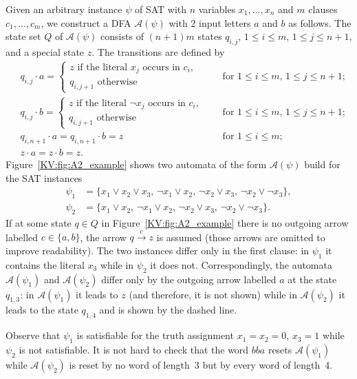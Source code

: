 \documentclass{irmaart}
\begin{document}
Given an arbitrary instance $\psi$ of \textsc{SAT} with $n$
variables $x_1,\dots,x_n$ and $m$ clauses $c_1,\dots,c_m$, we
construct a DFA $\mathcal{A}(\psi)$ with 2 input letters $a$ and
$b$ as follows. The state set $Q$ of $\mathcal{A}(\psi)$ consists
of $(n+1)m$ states $q_{i,j}$, $1 \le i \le m$, $1 \le j \le n+1$,
and a special state $z$. The transitions are defined by
\begin{align*}
& q_{i,j}\cdot a =
\begin{cases}
    z \text{ if the literal $x_j$ occurs in $c_i$},\\
    q_{i,j+1} \text{ otherwise}
\end{cases} && \text{ for $1 \le i \le m$, $1 \le j \le n+1$;} \\
&q_{i,j}\cdot b =
\begin{cases}
    z \text{ if the literal $\neg x_j$ occurs in $c_i$},\\
    q_{i,j+1} \text{ otherwise}
\end{cases} && \text{ for $1 \le i \le m$, $1 \le j \le n+1$;} \\
&q_{i,n+1}\cdot a=q_{i,n+1}\cdot b =z && \text{ for $1\le i\le
m$;}\\  &z\cdot a=z\cdot b =z.&&
\end{align*}
Figure~\ref{KV:fig:A2_example} shows two automata of the form
$\mathcal{A}(\psi)$ build for the \textsc{SAT} instances
\begin{align*}
\psi_1&=\{x_1 \vee x_2 \vee x_3,\, \neg x_1 \vee x_2,\, \neg x_2
\vee x_3,\,\neg x_2 \vee \neg x_3\},\\
\psi_2&=\{x_1 \vee x_2,\,\neg x_1 \vee x_2,\, \neg x_2 \vee
x_3,\,\neg x_2 \vee \neg x_3\}.
\end{align*}
If at some state $q\in Q$ in Figure~\ref{KV:fig:A2_example} there
is no outgoing arrow labelled $c\in\{a,b\}$, the arrow
$q\stackrel{c}{\to}z$ is assumed (those arrows are omitted to
improve readability). The two instances differ only in the first
clause: in $\psi_1$ it contains the literal $x_3$ while in
$\psi_2$ it does not. Correspondingly, the automata
$\mathcal{A}(\psi_1)$ and $\mathcal{A}(\psi_2)$ differ only by the
outgoing arrow labelled $a$ at the state $q_{1,3}$: in
$\mathcal{A}(\psi_1)$ it leads to $z$ (and therefore, it is not
shown) while in $\mathcal{A}(\psi_2)$ it leads to the state
$q_{1,4}$ and is shown by the dashed line.

Observe that $\psi_1$ is satisfiable for the truth assignment
$x_1=x_2=0$, $x_3=1$ while $\psi_2$ is not satisfiable. It is not
hard to check that the word $bba$ resets $\mathcal{A}(\psi_1)$
while $\mathcal{A}(\psi_2)$ is reset by no word of length~3 but by
every word of length~4.
\end{document}
